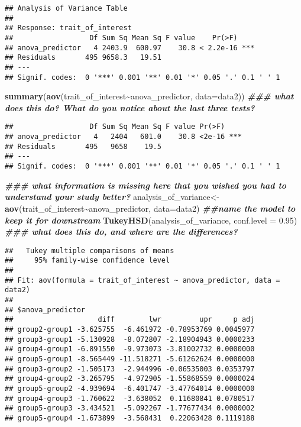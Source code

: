 \documentclass[
]{article}
\newenvironment{Shaded}{\begin{snugshade}}{\end{snugshade}}
\newcommand{\AttributeTok}[1]{\textcolor[rgb]{0.13,0.29,0.53}{#1}}
\newcommand{\DocumentationTok}[1]{\textcolor[rgb]{0.56,0.35,0.01}{\textbf{\textit{#1}}}}
\newcommand{\FloatTok}[1]{\textcolor[rgb]{0.00,0.00,0.81}{#1}}
\newcommand{\FunctionTok}[1]{\textcolor[rgb]{0.13,0.29,0.53}{\textbf{#1}}}
\newcommand{\NormalTok}[1]{#1}
\newcommand{\OtherTok}[1]{\textcolor[rgb]{0.56,0.35,0.01}{#1}}
\newcommand{\SpecialCharTok}[1]{\textcolor[rgb]{0.81,0.36,0.00}{\textbf{#1}}}
\begin{document}
\begin{verbatim}
## Analysis of Variance Table
## 
## Response: trait_of_interest
##                  Df Sum Sq Mean Sq F value    Pr(>F)    
## anova_predictor   4 2403.9  600.97    30.8 < 2.2e-16 ***
## Residuals       495 9658.3   19.51                      
## ---
## Signif. codes:  0 '***' 0.001 '**' 0.01 '*' 0.05 '.' 0.1 ' ' 1
\end{verbatim}

\begin{Shaded}
\begin{Highlighting}[]
\FunctionTok{summary}\NormalTok{(}\FunctionTok{aov}\NormalTok{(trait\_of\_interest}\SpecialCharTok{\textasciitilde{}}\NormalTok{anova\_predictor, }\AttributeTok{data=}\NormalTok{data2)) }\DocumentationTok{\#\#\# what does this do? What do you notice about the last three tests?}
\end{Highlighting}
\end{Shaded}

\begin{verbatim}
##                  Df Sum Sq Mean Sq F value Pr(>F)    
## anova_predictor   4   2404   601.0    30.8 <2e-16 ***
## Residuals       495   9658    19.5                   
## ---
## Signif. codes:  0 '***' 0.001 '**' 0.01 '*' 0.05 '.' 0.1 ' ' 1
\end{verbatim}

\begin{Shaded}
\begin{Highlighting}[]
\DocumentationTok{\#\#\# what information is missing here that you wished you had to understand your study better?}
\NormalTok{analysis\_of\_variance}\OtherTok{\textless{}{-}}\FunctionTok{aov}\NormalTok{(trait\_of\_interest}\SpecialCharTok{\textasciitilde{}}\NormalTok{anova\_predictor, }\AttributeTok{data=}\NormalTok{data2) }\DocumentationTok{\#\#name the model to keep it for downstream}
\FunctionTok{TukeyHSD}\NormalTok{(analysis\_of\_variance, }\AttributeTok{conf.level =} \FloatTok{0.95}\NormalTok{) }\DocumentationTok{\#\#\# what does this do, and where are the differences?}
\end{Highlighting}
\end{Shaded}

\begin{verbatim}
##   Tukey multiple comparisons of means
##     95% family-wise confidence level
## 
## Fit: aov(formula = trait_of_interest ~ anova_predictor, data = data2)
## 
## $anova_predictor
##                    diff        lwr         upr     p adj
## group2-group1 -3.625755  -6.461972 -0.78953769 0.0045977
## group3-group1 -5.130928  -8.072807 -2.18904943 0.0000233
## group4-group1 -6.891550  -9.973073 -3.81002732 0.0000000
## group5-group1 -8.565449 -11.518271 -5.61262624 0.0000000
## group3-group2 -1.505173  -2.944996 -0.06535003 0.0353797
## group4-group2 -3.265795  -4.972905 -1.55868559 0.0000024
## group5-group2 -4.939694  -6.401747 -3.47764014 0.0000000
## group4-group3 -1.760622  -3.638052  0.11680841 0.0780517
## group5-group3 -3.434521  -5.092267 -1.77677434 0.0000002
## group5-group4 -1.673899  -3.568431  0.22063428 0.1119188
\end{verbatim}
\end{document}
